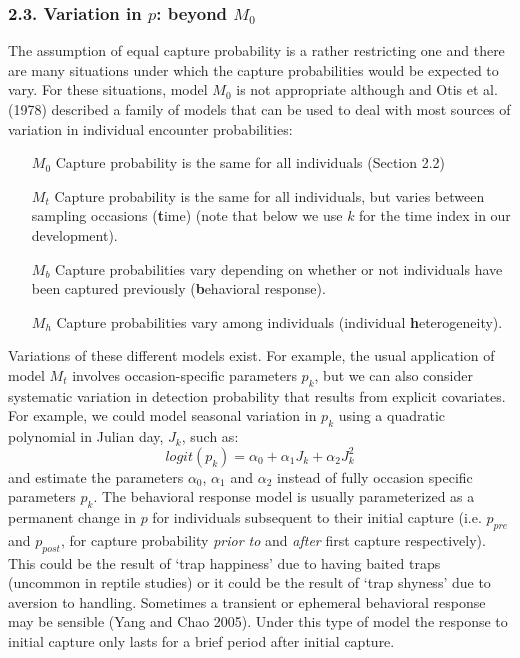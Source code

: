 \documentclass{book}
\begin{document}
\subsubsection*{2.3. Variation in $p$: beyond $M_0$}

The assumption of equal capture probability is a rather restricting
one and there are many situations under which the capture
probabilities would be expected to vary. For these situations, model
$M_0$ is not appropriate although and Otis et al. (1978) described a
family of models that can be used to deal with most sources of
variation in individual encounter probabilities:
\begin{itemize}
\item[$M_0$] Capture probability is the same for all individuals (Section 2.2)
\item[$M_t$] Capture probability is the same for all individuals, but
  varies between sampling occasions (\textbf{t}ime) (note that below we use
  $k$ for the time index in our development).
\item[$M_b$] Capture probabilities vary depending on whether or not
  individuals have been captured previously (\textbf{b}ehavioral
  response).
\item[$M_h$] Capture probabilities vary among individuals (individual
  \textbf{h}eterogeneity).
\end{itemize}

Variations of these different models exist. For example, the usual
application of model $M_t$ involves occasion-specific parameters
$p_{k}$, but we can also consider systematic variation in detection
probability that results from explicit covariates. For example, we
could model seasonal variation in $p_k$ using a quadratic polynomial
in Julian day, $J_{k}$, such as:
\[
 logit(p_{k}) = \alpha_0 + \alpha_1 J_{k} + \alpha_2 J^{2}_{k}
\]
and estimate the parameters $\alpha_0$, $\alpha_1$ and $\alpha_2$
instead of fully occasion specific parameters $p_k$.  The behavioral
response model is usually parameterized as a permanent change in $p$
for individuals subsequent to their initial capture (i.e. $p_{pre}$ and $p_{post}$, for capture probability {\it prior to} and {\it after} first capture respectively). This could be the
result of `trap happiness' due to having baited traps (uncommon in
reptile studies) or it could be the result of `trap shyness' due to
aversion to handling. Sometimes a transient or ephemeral behavioral
response may be sensible (Yang and Chao 2005). Under this type of
model the response to initial capture only lasts for a brief period
after initial capture.
\end{document}
